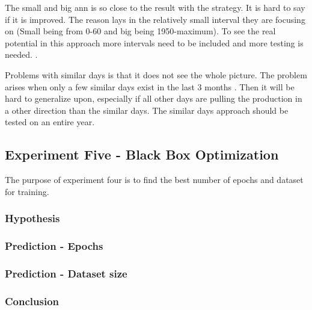 The small and big ann is so close to the result with the strategy. It is hard to say if it is improved. The reason lays in the relatively small interval they are focusing on (Small being from 0-60 and big being 1950-maximum). To see the real potential in this approach more intervals need to be included and more testing is needed. .

Problems with similar days is that it does not see the whole picture. The problem arises when only a few similar days exist in the last 3 months . Then it will be hard to generalize upon, especially if all other days are pulling the production in a other direction than the similar days. The similar days approach should be tested on an entire year.


\subsection{Experiment Five - Black Box Optimization}
The purpose of experiment four is to find the best number of epochs and dataset for training.

\subsubsection{Hypothesis}

\subsubsection{Prediction - Epochs}

\subsubsection{Prediction - Dataset size}

\subsubsection{Conclusion}
